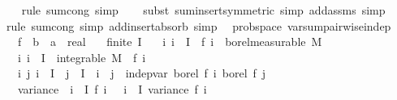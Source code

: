 \begin{isabellebody}
\ \ \isamarkupfalse%
\ {\isacharparenleft}{\kern0pt}rule\ sum{\isachardot}{\kern0pt}cong{\isacharcomma}{\kern0pt}\ simp{\isacharparenright}{\kern0pt}\isanewline
\ \ \isamarkupfalse%
\ {\isacharparenleft}{\kern0pt}subst\ sum{\isachardot}{\kern0pt}insert{\isacharbrackleft}{\kern0pt}symmetric{\isacharbrackright}{\kern0pt}{\isacharcomma}{\kern0pt}\ simp\ add{\isacharcolon}{\kern0pt}assms{\isacharcomma}{\kern0pt}\ simp{\isacharparenright}{\kern0pt}\isanewline
\ \ \isamarkupfalse%
\ {\isacharparenleft}{\kern0pt}rule\ sum{\isachardot}{\kern0pt}cong{\isacharcomma}{\kern0pt}\ simp\ add{\isacharcolon}{\kern0pt}insert{\isacharunderscore}{\kern0pt}absorb{\isacharcomma}{\kern0pt}\ simp{\isacharparenright}{\kern0pt}%
\endisatagproof
{\isafoldproof}%
%
\isadelimproof
\isanewline
%
\endisadelimproof
\isanewline
{}\isamarkupfalse%
\ {\isacharparenleft}{\kern0pt}\ prob{\isacharunderscore}{\kern0pt}space{\isacharparenright}{\kern0pt}\ var{\isacharunderscore}{\kern0pt}sum{\isacharunderscore}{\kern0pt}pairwise{\isacharunderscore}{\kern0pt}indep{\isacharcolon}{\kern0pt}\isanewline
\ \ \ f\ {\isacharcolon}{\kern0pt}{\isacharcolon}{\kern0pt}\ {\isachardoublequoteopen}{\isacharprime}{\kern0pt}b\ {\isasymRightarrow}\ {\isacharprime}{\kern0pt}a\ {\isasymRightarrow}\ real{\isachardoublequoteclose}\isanewline
\ \ \ {\isachardoublequoteopen}finite\ I{\isachardoublequoteclose}\isanewline
\ \ \ {\isachardoublequoteopen}{\isasymAnd}i{\isachardot}{\kern0pt}\ i\ {\isasymin}\ I\ {\isasymLongrightarrow}\ f\ i\ {\isasymin}\ borel{\isacharunderscore}{\kern0pt}measurable\ M{\isachardoublequoteclose}\isanewline
\ \ \ {\isachardoublequoteopen}{\isasymAnd}i{\isachardot}{\kern0pt}\ i\ {\isasymin}\ I\ {\isasymLongrightarrow}\ integrable\ M\ {\isacharparenleft}{\kern0pt}{\isasymlambda}{\isasymomega}{\isachardot}{\kern0pt}\ f\ i\ {\isasymomega}{\isacharcircum}{\kern0pt}{}{\isacharparenright}{\kern0pt}{\isachardoublequoteclose}\isanewline
\ \ \ {\isachardoublequoteopen}{\isasymAnd}i\ j{\isachardot}{\kern0pt}\ i\ {\isasymin}\ I\ {\isasymLongrightarrow}\ j\ {\isasymin}\ I\ {\isasymLongrightarrow}\ i\ {\isasymnoteq}\ j\ {\isasymLongrightarrow}\ indep{\isacharunderscore}{\kern0pt}var\ borel\ {\isacharparenleft}{\kern0pt}f\ i{\isacharparenright}{\kern0pt}\ borel\ {\isacharparenleft}{\kern0pt}f\ j{\isacharparenright}{\kern0pt}{\isachardoublequoteclose}\isanewline
\ \ \ {\isachardoublequoteopen}variance\ {\isacharparenleft}{\kern0pt}{\isasymlambda}{\isasymomega}{\isachardot}{\kern0pt}\ {\isacharparenleft}{\kern0pt}{\isasymSum}i\ {\isasymin}\ I{\isachardot}{\kern0pt}\ f\ i\ {\isasymomega}{\isacharparenright}{\kern0pt}{\isacharparenright}{\kern0pt}\ {\isacharequal}{\kern0pt}\ {\isacharparenleft}{\kern0pt}{\isasymSum}i\ {\isasymin}\ I{\isachardot}{\kern0pt}\ variance\ {\isacharparenleft}{\kern0pt}f\ i{\isacharparenright}{\kern0pt}{\isacharparenright}{\kern0pt}{\isachardoublequoteclose}\isanewline

\end{isabellebody}
